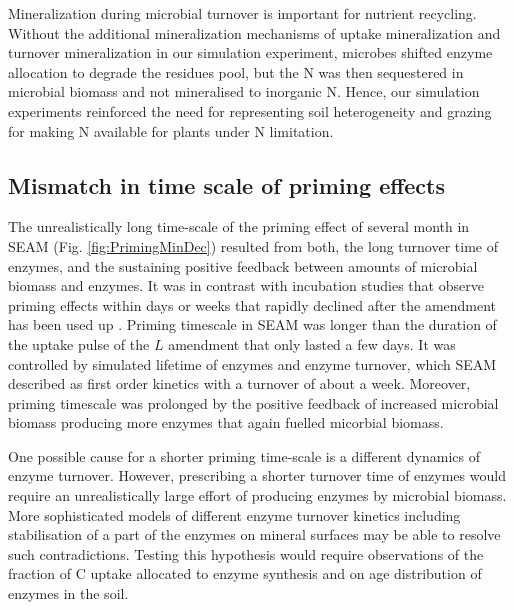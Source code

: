 Mineralization during microbial turnover is important for nutrient recycling.
Without the additional mineralization mechanisms of uptake mineralization
\citep{Manzoni08} and turnover mineralization \citep{Clarholm85, Raynaud06} in
our simulation experiment, microbes shifted enzyme allocation to degrade the
residues pool, but the N was then sequestered in microbial biomass and not
mineralised to inorganic N. Hence, our simulation experiments reinforced the
need for representing soil heterogeneity and grazing for making N available for
plants under N limitation.

\subsection{Mismatch in time scale of priming effects}
The unrealistically long time-scale of the priming effect of several month in
SEAM (Fig. \ref{fig:PrimingMinDec}) resulted from both, the long turnover time of
enzymes, and the sustaining positive feedback between amounts of microbial
biomass and enzymes. It was in contrast with incubation studies that observe
priming effects within days or weeks that rapidly declined after the amendment
has been used up \citep{Blagodatskaya14}.
Priming timescale in SEAM was longer than the duration of the uptake pulse of
the $L$ amendment that only lasted a few days. It was controlled by simulated
lifetime of enzymes and enzyme turnover, which SEAM described as first order
kinetics with a turnover of about a week. Moreover, priming timescale was
prolonged by the positive feedback of increased microbial biomass producing more
enzymes that again fuelled micorbial biomass. 


One possible cause for a shorter priming time-scale is a different dynamics of
enzyme turnover. However, prescribing a shorter turnover time of enzymes would
require an unrealistically large effort of producing enzymes by microbial
biomass. More sophisticated models of different enzyme turnover kinetics
including stabilisation of a part of the enzymes on mineral surfaces
\citep{Burns13} may be able to resolve such contradictions. Testing this
hypothesis would require observations of the fraction of C uptake allocated to
enzyme synthesis and on age distribution of enzymes in the soil.  

